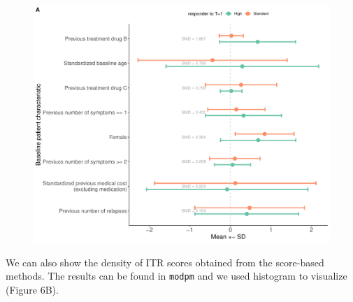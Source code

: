 \documentclass[
  letterpaper,
  DIV=11,
  numbers=noendperiod]{scrreprt}
\begin{document}
\begin{figure}[H]

{\centering \includegraphics{chapter_18_files/figure-pdf/unicomp.visual-1.pdf}

}

\end{figure}

We can also show the density of ITR scores obtained from the score-based
methods. The results can be found in \texttt{modpm} and we used
histogram to visualize (Figure 6B).
\end{document}

